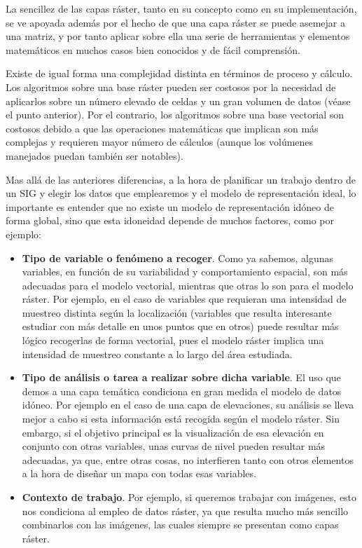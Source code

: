 \begin{multicols}{2}
\begin{itemize}
La sencillez de las capas ráster, tanto en su concepto como en su implementación, se ve apoyada además por el hecho de que una capa ráster se puede asemejar a una matriz, y por tanto aplicar sobre ella una serie de herramientas y elementos matemáticos en muchos casos bien conocidos y de fácil comprensión.

Existe de igual forma una complejidad distinta en términos de proceso y cálculo. Los algoritmos sobre una base ráster pueden ser costosos por la necesidad de aplicarlos sobre un número elevado de celdas y un gran volumen de datos (véase el punto anterior). Por el contrario, los algoritmos sobre una base vectorial son costosos debido a que las operaciones matemáticas que implican son más complejas y requieren mayor número de cálculos (aunque los volúmenes manejados puedan también ser notables).
\end{itemize}

Mas allá de las anteriores diferencias, a la hora de planificar un trabajo dentro de un SIG y elegir los datos que emplearemos y el modelo de representación ideal, lo importante es entender que no existe un modelo de representación idóneo de forma global, sino que esta idoneidad depende de muchos factores, como por ejemplo:

\begin{itemize}
 \item \textbf{Tipo de variable o fenómeno a recoger}. Como ya sabemos, algunas variables, en función de su variabilidad y comportamiento espacial, son más adecuadas para el modelo vectorial, mientras que otras lo son para el modelo ráster. Por ejemplo, en el caso de variables que requieran una intensidad de muestreo distinta según la localización (variables que resulta interesante estudiar con más detalle en unos puntos que en otros) puede resultar más lógico recogerlas de forma vectorial, pues el modelo ráster implica una intensidad de muestreo constante a lo largo del área estudiada.
\item \textbf{Tipo de análisis o tarea a realizar sobre dicha variable}. El uso que demos a una capa temática condiciona en gran medida el modelo de datos idóneo. Por ejemplo en el caso de una capa de elevaciones, su análisis se lleva mejor a cabo si esta información está recogida según el modelo ráster. Sin embargo, si el objetivo principal es la visualización de esa elevación en conjunto con otras variables, unas curvas de nivel pueden resultar más adecuadas, ya que, entre otras cosas, no interfieren tanto con otros elementos a la hora de diseñar un mapa con todas esas variables.
\item \textbf{Contexto de trabajo}. Por ejemplo, si queremos trabajar con imágenes, esto nos condiciona al empleo de datos ráster, ya que resulta mucho más sencillo combinarlos con las imágenes, las cuales siempre se presentan como capas ráster. 
\end{itemize}


\end{multicols}

